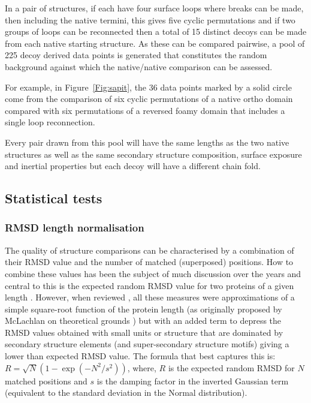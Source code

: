 \documentclass[preprint,12pt]{elsarticle}
\newcommand{\Fig}[1]{Figure~\ref{Fig:#1}}
\begin{document}
In a pair of structures, if each have four surface loops where breaks can be made, then
including the native termini, this gives five cyclic permutations and if two groups of
loops can be reconnected then a total of 15 distinct decoys can be made from each native
starting structure.   As these can be compared pairwise, a pool of 225 decoy derived
data points is generated that constitutes the random background against which the native/native
comparison can be assessed.

For example, in \Fig{sapit}, the 36 data
points marked by a solid circle come from the comparison of six cyclic permutations of a
native ortho domain compared with six permutations of a reversed foamy domain that includes
a single loop reconnection.

Every pair drawn from this pool will have the same lengths as the two native structures
as well as the same secondary structure composition, surface exposure and inertial properties
but each decoy will have a different chain fold.


\subsection{Statistical tests}

\subsubsection{RMSD length normalisation}

The quality of structure comparisons can be characterised by a combination of their
RMSD value and the number of matched (superposed) positions.  How to combine these values has
been the subject of much discussion over the years and central to this is the expected random
RMSD value for two proteins of a given length \cite{McLachlanAD84,CohenFEet80d,MaiorovVNet94}.   However,
when reviewed \cite{TaylorWR06a}, all these measures were approximations of a simple square-root function of
the protein length (as originally proposed by McLachlan on theoretical grounds \cite{McLachlanAD84})
but with an added term to depress the RMSD values obtained with small units or structure
that are dominated by secondary structure elements (and super-secondary structure motifs)
giving a lower than expected RMSD value.   The formula that best captures this is:
$R = \surd N (1-\exp(-N^2/s^2))$,
where,
$R$ is the expected random RMSD for $N$ matched positions and $s$ is the damping factor in the inverted
Gaussian term (equivalent to the standard deviation in the Normal distribution).
\end{document}
